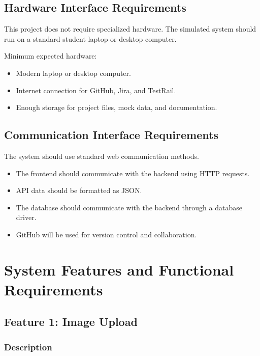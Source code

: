 \documentclass[12pt]{article}
\begin{document}
\subsection{Hardware Interface Requirements}

This project does not require specialized hardware. The simulated system should run on a standard student laptop or desktop computer.

Minimum expected hardware:

\begin{itemize}
    \item Modern laptop or desktop computer.
    \item Internet connection for GitHub, Jira, and TestRail.
    \item Enough storage for project files, mock data, and documentation.
\end{itemize}

\subsection{Communication Interface Requirements}

The system should use standard web communication methods.

\begin{itemize}
    \item The frontend should communicate with the backend using HTTP requests.
    \item API data should be formatted as JSON.
    \item The database should communicate with the backend through a database driver.
    \item GitHub will be used for version control and collaboration.
\end{itemize}

\section{System Features and Functional Requirements}

\subsection{Feature 1: Image Upload}

\subsubsection{Description}
\end{document}
